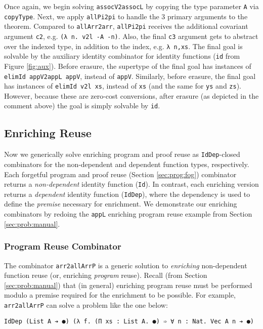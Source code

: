 \documentclass[acmsmall]{acmart}\settopmatter{}
\newcommand{\refsec}[1]{Section \ref{sec:#1}}
\newcommand{\labsec}[1]{\label{sec:#1}}
\newcommand{\reffig}[1]{Figure \ref{fig:#1}}
\begin{document}
Once again, we begin solving \verb;assocV2assocL; by copying the type
parameter \verb;A; via \verb;copyType;. Next, we apply \verb;allPi2pi;
to handle the 3 primary arguments to the theorem. Compared to
\verb;allArr2arr;, \verb;allPi2pi; receives the additional covariant
argument \verb;c2;, e.g. \verb;(λ n. v2l -A -n);. Also, the final
\verb;c3; argument gets to abstract over the indexed type, in addition
to the index, e.g. \verb;λ n,xs;. The final goal is solvable by the
auxiliary identity combinator for identity functions
(\verb;id; from \reffig{aux}). Before erasure, the supertype of the final goal has
instances of \verb;elimId appV2appL appV;, instead of
\verb;appV;. Similarly, before erasure, the final goal
has instances of \verb;elimId v2l xs;, instead of
\verb;xs; (and the same for \verb;ys; and \verb;zs;).
However, because these are zero-cost conversions, after
erasure (as depicted in the comment above)
the goal is simply solvable by \verb;id;.

\subsection{Enriching Reuse}
\labsec{prog:enr}

Now we generically solve
enriching program and proof reuse as \verb;IdDep;-closed
combinators for the non-dependent and dependent function types,
respectively.
Each forgetful program and proof reuse (\refsec{prog:fog})
combinator returns a \textit{non-dependent} identity function (\verb;Id;). In
contrast, each enriching version returns a \textit{dependent}
identity function (\verb;IdDep;), where the dependency is used to
define the \textit{premise} necessary for enrichment.
We demonstrate our enriching combinators by
redoing the \verb;appL; enriching program reuse example from
\refsec{prob:manual}.

\subsubsection{Program Reuse Combinator}

The combinator \verb;arr2allArrP; is a generic solution to
\textit{enriching} non-dependent function reuse
(or, enriching \textit{program} reuse).
Recall (from \refsec{prob:manual}) that (in general)
enriching program reuse must be
performed modulo a premise required for the enrichment
to be possible.
For example, \verb;arr2allArrP; can solve a problem like the one
below:

\begin{verbatim}
IdDep (List A ➔ ●) (λ f. (Π xs : List A. ●) ➾ ∀ n : Nat. Vec A n ➔ ●)
\end{verbatim}
\end{document}

